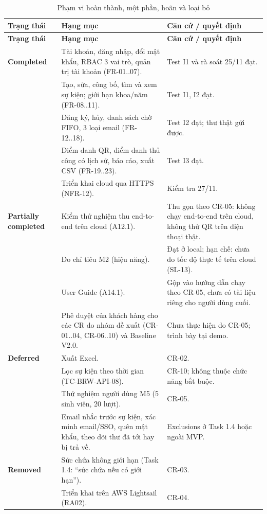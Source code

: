 \begingroup\small
\renewcommand{\arraystretch}{1.15}
\begin{longtable}{@{}p{.15\linewidth}p{.40\linewidth}p{.38\linewidth}@{}}
\caption{Phạm vi hoàn thành, một phần, hoãn và loại bỏ}\label{tab:t4-scope}\\
\toprule
\textbf{Trạng thái} & \textbf{Hạng mục} & \textbf{Căn cứ / quyết định}\\\midrule\endfirsthead
\toprule
\textbf{Trạng thái} & \textbf{Hạng mục} & \textbf{Căn cứ / quyết định}\\\midrule\endhead
\bottomrule\endfoot
\textbf{Completed} & Tài khoản, đăng nhập, đổi mật khẩu, RBAC 3 vai trò, quản trị tài khoản (FR-01..07). & Test I1 và rà soát 25/11 đạt.\\
 & Tạo, sửa, công bố, tìm và xem sự kiện; giới hạn khoa/năm (FR-08..11). & Test I1, I2 đạt.\\
 & Đăng ký, hủy, danh sách chờ FIFO, 3 loại email (FR-12..18). & Test I2 đạt; thư thật gửi được.\\
 & Điểm danh QR, điểm danh thủ công có lịch sử, báo cáo, xuất CSV (FR-19..23). & Test I3 đạt.\\
 & Triển khai cloud qua HTTPS (NFR-12). & Kiểm tra 27/11.\\
\midrule
\textbf{Partially completed} & Kiểm thử nghiệm thu end-to-end trên cloud (A12.1). & Thu gọn theo CR-05: không chạy end-to-end trên cloud, không thử QR trên điện thoại thật.\\
 & Đo chỉ tiêu M2 (hiệu năng). & Đạt ở local; hạn chế: chưa đo tốc độ thực tế trên cloud (SL-13).\\
 & User Guide (A14.1). & Gộp vào hướng dẫn chạy theo CR-05, chưa có tài liệu riêng cho người dùng cuối.\\
 & Phê duyệt của khách hàng cho các CR do nhóm đề xuất (CR-01..04, CR-06..10) và Baseline V2.0. & Chưa thực hiện do CR-05; trình bày tại demo.\\
\midrule
\textbf{Deferred} & Xuất Excel. & CR-02.\\
 & Lọc sự kiện theo thời gian (TC-BRW-API-08). & CR-10; không thuộc chức năng bắt buộc.\\
 & Thử nghiệm người dùng M5 (5 sinh viên, 20 lượt). & CR-05.\\
 & Email nhắc trước sự kiện, xác minh email/SSO, quên mật khẩu, theo dõi thư đã tới hay bị trả về. & Exclusions ở Task 1.4 hoặc ngoài MVP.\\
\midrule
\textbf{Removed} & Sức chứa không giới hạn (Task 1.4: ``sức chứa nếu có giới hạn''). & CR-03.\\
 & Triển khai trên AWS Lightsail (RA02). & CR-04.\\
\end{longtable}
\endgroup

